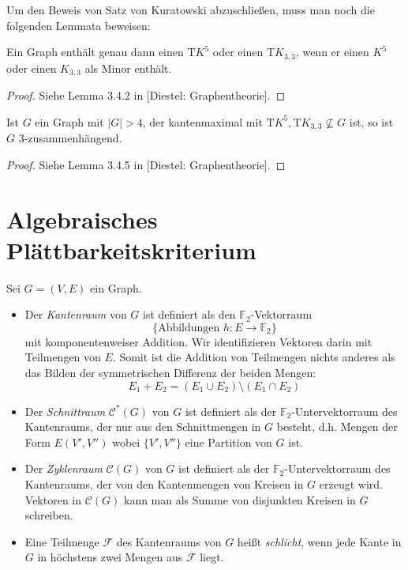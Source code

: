 \documentclass[10pt,b5paper]{article}
\begin{document}
Um den Beweis von Satz von Kuratowski abzuschließen, muss man noch die folgenden Lemmata beweisen:

\begin{lemma}
Ein Graph enthält genau dann einen $\mathrm{T}K^5$ oder einen $\mathrm{T}K_{3,3}$, wenn er einen $K^5$ oder einen $K_{3,3}$ als Minor enthält.
\end{lemma}

\begin{proof}
Siehe Lemma 3.4.2 in [Diestel: Graphentheorie].
\end{proof}

\begin{lemma}
Ist $G$ ein Graph mit $|G|>4$, der kantenmaximal mit $\mathrm{T}K^5,\mathrm{T}K_{3,3}\not\subseteq G$ ist, so ist $G$ $3$-zusammenhängend.
\end{lemma}

\begin{proof}
Siehe Lemma 3.4.5 in [Diestel: Graphentheorie].
\end{proof}

\section{Algebraisches Plättbarkeitskriterium}

\begin{definition}
Sei $G=(V, E)$ ein Graph.
\begin{itemize}
\item Der \textit{Kantenraum} von $G$ ist definiert als den $\mathbb{F}_2$-Vektorraum 
\[\{\text{Abbildungen } h:E\to\mathbb{F}_2\}\] 
mit komponentenweiser Addition. Wir identifizieren Vektoren darin mit Teilmengen von $E$. Somit ist die Addition von Teilmengen nichts anderes als das Bilden der symmetrischen Differenz der beiden Mengen:
\[ E_1 + E_2 = (E_1 \cup E_2) \setminus (E_1\cap E_2) \]
\item Der \textit{Schnittraum} $\mathcal{C}^\ast(G)$ von $G$ ist definiert als der $\mathbb{F}_2$-Untervektorraum des Kantenraums, der nur aus den Schnittmengen in $G$ besteht, d.h. Mengen der Form $E(V', V'')$ wobei $\{V', V''\}$ eine Partition von $G$ ist.
\item  Der \textit{Zyklenraum} $\mathcal{C}(G)$ von $G$ ist definiert als der $\mathbb{F}_2$-Untervektorraum des Kantenraums, der von den Kantenmengen von Kreisen in $G$ erzeugt wird. Vektoren in $\mathcal{C}(G)$ kann man als Summe von disjunkten Kreisen in $G$ schreiben.
\item Eine Teilmenge $\mathcal{F}$ des Kantenraums von $G$ heißt \textit{schlicht}, wenn jede Kante in $G$ in höchstens zwei Mengen aus $\mathcal{F}$ liegt.
\end{itemize}
\end{definition}
\end{document}
